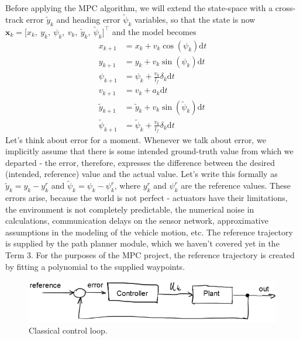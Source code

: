 \documentclass[a4paper]{article}
\begin{document}
Before applying the MPC algorithm, we will extend the state-space with a cross-track error \( \tilde{y}_k \) and heading error \( \tilde{\psi}_k \) variables, so that the state is now \( \bm{x}_k = \big[x_k,\ y_k,\ \psi_k,\ v_k,\ \tilde{y}_k,\ \tilde{\psi}_k \big]^\top \) and the model becomes
\begin{align}\label{eq:mpc_ssm_extended}
	x_{k+1} 			&= x_k + v_k\cos(\psi_k) \mathrm{d}t \\
	y_{k+1} 			&= y_k + v_k\sin(\psi_k) \mathrm{d}t \\
	\psi_{k+1} 			&= \psi_k + \frac{v_k}{l_f}\delta_k \mathrm{d}t \\
	v_{k+1} 			&= v_k + a_k\mathrm{d}t \\
	\tilde{y}_{k+1}		&= \tilde{y}_k + v_k\sin(\tilde{\psi}_k)\mathrm{d}t \\
	\tilde{\psi}_{k+1}	&= \tilde{\psi}_{k} + \frac{v_k}{l_f} \delta_k \mathrm{d}t
\end{align}
Let's think about error for a moment. 
Whenever we talk about error, we implicitly assume that there is some intended ground-truth value from which we departed - the error, therefore, expresses the difference between the desired (intended, reference) value and the actual value.
Let's write this formally as \( \tilde{y}_k = y_k - y^r_k \) and \( \tilde{\psi}_k = \psi_k - \psi^r_k \), where \( y^r_k \) and \( \psi^r_k \) are the reference values.
These errors arise, because the world is not perfect - actuators have their limitations, the environment is not completely predictable, the numerical noise in calculations, communication delays on the sensor network, approximative assumptions in the modeling of the vehicle motion, etc.
The reference trajectory is supplied by the path planner module, which we haven't covered yet in the Term 3. 
For the purposes of the MPC project, the reference trajectory is created by fitting a polynomial to the supplied waypoints.


\begin{figure}
	\centering
	\includegraphics[width=\columnwidth]{./img/control_loop.png}
	\caption{Classical control loop.}
\end{figure}
\end{document}
